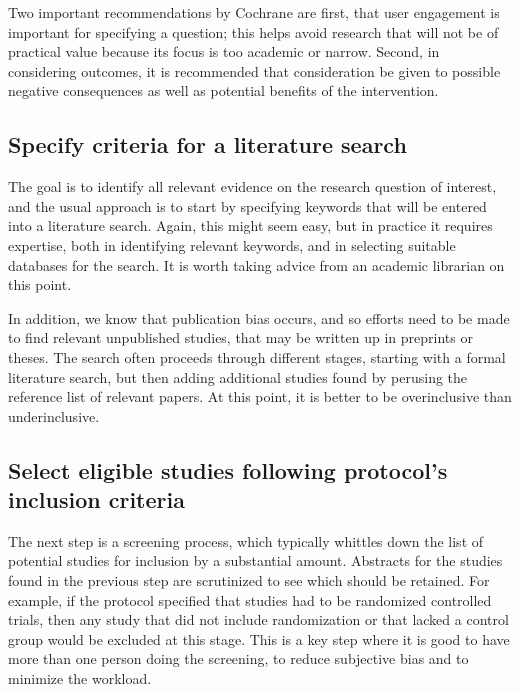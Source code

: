 \documentclass{krantz}
\begin{document}
Two important recommendations by Cochrane are first, that user engagement is important for specifying a question; this helps avoid research that will not be of practical value because its focus is too academic or narrow. Second, in considering outcomes, it is recommended that consideration be given to possible negative consequences as well as potential benefits of the intervention.

\hypertarget{specify-criteria-for-a-literature-search}{%
\subsection{Specify criteria for a literature search}\label{specify-criteria-for-a-literature-search}}

The goal is to identify all relevant evidence on the research question of interest, and the usual approach is to start by specifying keywords that will be entered into a literature search. Again, this might seem easy, but in practice it requires expertise, both in identifying relevant keywords, and in selecting suitable databases for the search. It is worth taking advice from an academic librarian on this point.

In addition, we know that publication bias occurs, and so efforts need to be made to find relevant unpublished studies, that may be written up in preprints or theses. The search often proceeds through different stages, starting with a formal literature search, but then adding additional studies found by perusing the reference list of relevant papers. At this point, it is better to be overinclusive than underinclusive.

\hypertarget{select-eligible-studies-following-protocols-inclusion-criteria}{%
\subsection{Select eligible studies following protocol's inclusion criteria}\label{select-eligible-studies-following-protocols-inclusion-criteria}}

The next step is a screening process, which typically whittles down the list of potential studies for inclusion by a substantial amount. Abstracts for the studies found in the previous step are scrutinized to see which should be retained. For example, if the protocol specified that studies had to be randomized controlled trials, then any study that did not include randomization or that lacked a control group would be excluded at this stage. This is a key step where it is good to have more than one person doing the screening, to reduce subjective bias and to minimize the workload.
\end{document}
